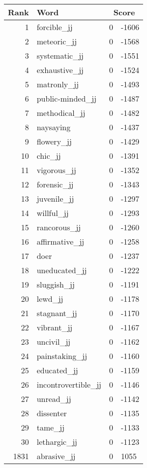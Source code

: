 \begin{longtable}[!htbp]{| rlr@{.}l |}
    \hline
    \textbf{Rank} & \textbf{Word} & \multicolumn{2}{c|}{\textbf{Score}} \\
    \hline
    \endhead
    1 & forcible\_jj & 0 & -1606 \\
    2 & meteoric\_jj & 0 & -1568 \\
    3 & systematic\_jj & 0 & -1551 \\
    4 & exhaustive\_jj & 0 & -1524 \\
    5 & matronly\_jj & 0 & -1493 \\
    6 & public-minded\_jj & 0 & -1487 \\
    7 & methodical\_jj & 0 & -1482 \\
    8 & naysaying & 0 & -1437 \\
    9 & flowery\_jj & 0 & -1429 \\
    10 & chic\_jj & 0 & -1391 \\
    11 & vigorous\_jj & 0 & -1352 \\
    12 & forensic\_jj & 0 & -1343 \\
    13 & juvenile\_jj & 0 & -1297 \\
    14 & willful\_jj & 0 & -1293 \\
    15 & rancorous\_jj & 0 & -1260 \\
    16 & affirmative\_jj & 0 & -1258 \\
    17 & doer & 0 & -1237 \\
    18 & uneducated\_jj & 0 & -1222 \\
    19 & sluggish\_jj & 0 & -1191 \\
    20 & lewd\_jj & 0 & -1178 \\
    21 & stagnant\_jj & 0 & -1170 \\
    22 & vibrant\_jj & 0 & -1167 \\
    23 & uncivil\_jj & 0 & -1162 \\
    24 & painstaking\_jj & 0 & -1160 \\
    25 & educated\_jj & 0 & -1159 \\
    26 & incontrovertible\_jj & 0 & -1146 \\
    27 & unread\_jj & 0 & -1142 \\
    28 & dissenter & 0 & -1135 \\
    29 & tame\_jj & 0 & -1133 \\
    30 & lethargic\_jj & 0 & -1123 \\
    1831 & abrasive\_jj & 0 & 1055 \\

\end{longtable}
